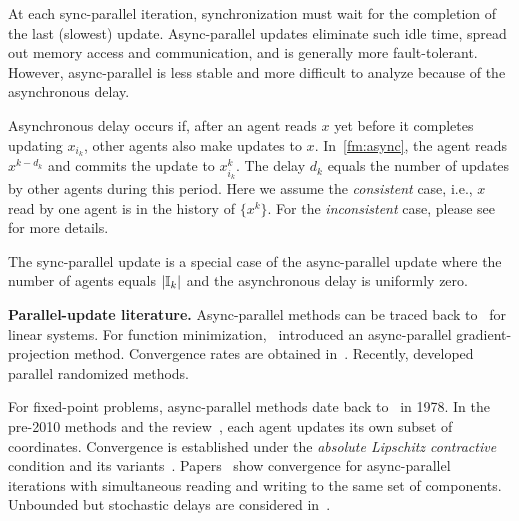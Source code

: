 At each sync-parallel iteration, synchronization must wait for the completion of the last (slowest) update. %
Async-parallel updates eliminate such idle time, spread out memory access and  communication, and is generally  more fault-tolerant. However, async-parallel is less stable and more difficult to analyze because of the asynchronous delay.

Asynchronous delay occurs if, after an agent reads $x$ yet before it completes updating $x_{i_k}$, other agents also make updates to $x$. In~\eqref{fm:async}, the agent reads $x^{k-d_k}$ and commits the update to $x_{i_k}^k$. The delay $d_k$ equals the number of updates by other agents during this period. Here we assume the \emph{consistent} case, i.e., $x$ read by one agent is in the history of $\{x^k\}$. For the \emph{inconsistent} case, please see~\cite[Section 1.2]{Peng_2015_AROCK} for more details.


The sync-parallel update is a special case of the async-parallel update where the number of agents equals $|\mathbb{I}_k|$ and  the asynchronous delay is uniformly zero.

\textbf{Parallel-update literature.} 
Async-parallel methods can be traced back to~\cite{chazan1969chaotic} for linear systems. For function minimization,~\cite{bertsekas1989parallel} introduced an async-parallel gradient-projection method. Convergence rates are obtained in~\cite{tseng1991rate-asyn}.  
Recently, \cite{bradley2011parallel,richtarik2012parallel} developed parallel randomized methods. 

For fixed-point problems, async-parallel methods date back to~\cite{Baudet_1978_asynchronous} in 1978. In  the pre-2010 methods \cite{BMR1997asyn-multisplit,bertsekas1983distributed,Baz200591,el1998flexible} and the review~\cite{Frommer2000201}, each agent updates its own subset of coordinates. Convergence is established under the \emph{absolute Lipschitz contractive} condition and its variants~\cite{bertsekas1983distributed}. Papers~\cite{Baz200591,Baz1998429} show convergence for async-parallel iterations with simultaneous reading and writing to the same set of components. Unbounded but stochastic delays are considered in~\cite{Strikwerda2002125}.


